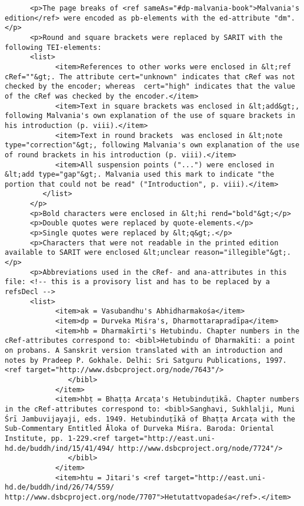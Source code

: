 \documentclass[article,12pt,a4paper]{memoir}
\begin{document}
\begin{verbatim}
      <p>The page breaks of <ref sameAs="#dp-malvania-book">Malvania's edition</ref> were encoded as pb-elements with the ed-attribute "dm".</p>
      <p>Round and square brackets were replaced by SARIT with the following TEI-elements:
      <list>
            <item>References to other works were enclosed in &lt;ref cRef=""&gt;. The attribute cert="unknown" indicates that cRef was not checked by the encoder; whereas  cert="high" indicates that the value of the cRef was checked by the encoder.</item>
            <item>Text in square brackets was enclosed in &lt;add&gt;, following Malvania's own explanation of the use of square brackets in his introduction (p. viii).</item>
            <item>Text in round brackets  was enclosed in &lt;note type="correction"&gt;, following Malvania's own explanation of the use of round brackets in his introduction (p. viii).</item>
            <item>All suspension points ("...") were enclosed in &lt;add type="gap"&gt;. Malvania used this mark to indicate "the portion that could not be read" ("Introduction", p. viii).</item>
         </list>
      </p>
      <p>Bold characters were enclosed in &lt;hi rend="bold"&gt;</p>
      <p>Double quotes were replaced by quote-elements.</p>
      <p>Single quotes were replaced by &lt;q&gt;.</p>
      <p>Characters that were not readable in the printed edition available to SARIT were enclosed &lt;unclear reason="illegible"&gt;.</p>
      <p>Abbreviations used in the cRef- and ana-attributes in this file: <!-- this is a provisory list and has to be replaced by a refsDecl -->
      <list>
            <item>ak = Vasubandhu's Abhidharmakośa</item>
            <item>dp = Durveka Miśra's, Dharmottarapradīpa</item>
            <item>hb = Dharmakīrti's Hetubindu. Chapter numbers in the cRef-attributes correspond to: <bibl>Hetubindu of Dharmakīti: a point on probans. A Sanskrit version translated with an introduction and notes by Pradeep P. Gokhale. Delhi: Sri Satguru Publications, 1997.<ref target="http://www.dsbcproject.org/node/7643"/>
               </bibl>
            </item>
            <item>hbṭ = Bhaṭṭa Arcaṭa's Hetubinduṭikā. Chapter numbers in the cRef-attributes correspond to: <bibl>Sanghavi, Sukhlalji, Muni Śrī Jambuvijayaji, eds. 1949. Hetubinduṭīkā of Bhaṭṭa Arcaṭa with the Sub-Commentary Entitled Āloka of Durveka Miśra. Baroda: Oriental Institute, pp. 1-229.<ref target="http://east.uni-hd.de/buddh/ind/15/41/494/ http://www.dsbcproject.org/node/7724"/>
               </bibl>
            </item>
            <item>htu = Jitari's <ref target="http://east.uni-hd.de/buddh/ind/26/74/559/ http://www.dsbcproject.org/node/7707">Hetutattvopadeśa</ref>.</item>

\end{verbatim}
\end{document}
